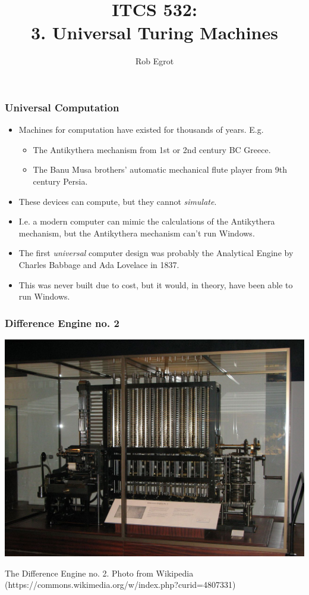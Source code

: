 \documentclass[handout]{beamer}
\title{ITCS 532:\\ 
3. Universal Turing Machines}
\date{}
\author{Rob Egrot}
\begin{document}
\begin{frame}
\titlepage
\end{frame}

\begin{frame}
\frametitle{Universal Computation}
\begin{itemize}
\item Machines for computation have existed for thousands of years. E.g.
\begin{itemize}
\item The Antikythera mechanism from 1st or 2nd century BC Greece.
\item The Banu Musa brothers' automatic mechanical flute player from 9th century Persia.
\end{itemize} 
\item These devices can compute, but they cannot \emph{simulate}.
\item I.e. a modern computer can mimic the calculations of the Antikythera mechanism, but the Antikythera mechanism can't run Windows.
\item The first \emph{universal} computer design was probably the Analytical Engine by Charles Babbage and Ada Lovelace in 1837.
\item This was never built due to cost, but it would, in theory, have been able to run Windows.
\end{itemize}
\end{frame}

\begin{frame}
\frametitle{Difference Engine no. 2}
\includegraphics[scale = 0.22]{DE2.jpg}  

The Difference Engine no. 2. Photo from Wikipedia (https://commons.wikimedia.org/w/index.php?curid=4807331)
\end{frame}
\end{document}
